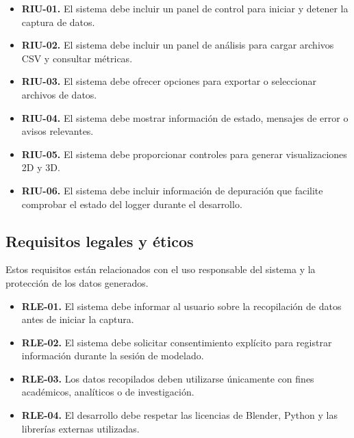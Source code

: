 \begin{itemize}
    \item \textbf{RIU-01.} El sistema debe incluir un panel de control para iniciar y detener la captura de datos.

    \item \textbf{RIU-02.} El sistema debe incluir un panel de análisis para cargar archivos CSV y consultar métricas.

    \item \textbf{RIU-03.} El sistema debe ofrecer opciones para exportar o seleccionar archivos de datos.

    \item \textbf{RIU-04.} El sistema debe mostrar información de estado, mensajes de error o avisos relevantes.

    \item \textbf{RIU-05.} El sistema debe proporcionar controles para generar visualizaciones 2D y 3D.

    \item \textbf{RIU-06.} El sistema debe incluir información de depuración que facilite comprobar el estado del logger durante el desarrollo.
\end{itemize}

\subsection{Requisitos legales y éticos}

Estos requisitos están relacionados con el uso responsable del sistema y la protección de los datos generados.

\begin{itemize}
    \item \textbf{RLE-01.} El sistema debe informar al usuario sobre la recopilación de datos antes de iniciar la captura.

    \item \textbf{RLE-02.} El sistema debe solicitar consentimiento explícito para registrar información durante la sesión de modelado.

    \item \textbf{RLE-03.} Los datos recopilados deben utilizarse únicamente con fines académicos, analíticos o de investigación.

    \item \textbf{RLE-04.} El desarrollo debe respetar las licencias de Blender, Python y las librerías externas utilizadas.
\end{itemize}

